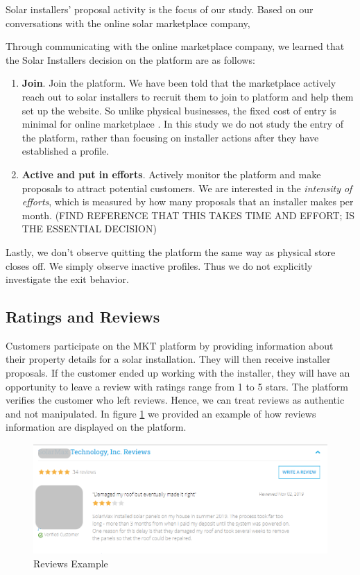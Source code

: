 \documentclass[msom,blindrev]{informs3}
\begin{document}
Solar installers' proposal activity is the focus of our study. Based on our conversations with the online solar marketplace company,  

Through communicating with the online marketplace company, we learned that the Solar Installers decision on the platform are as follows:

\begin{enumerate}
\item  \textbf{Join}. Join the platform. We have been told that the marketplace actively reach out to solar installers to recruit them to join to platform and help them set up the website. So unlike physical businesses, the fixed cost of entry is minimal for online marketplace \citep{haddad2015consumer}. In this study we do not study the entry of the platform, rather than focusing on installer actions after they have established a profile.  \\
\item  \textbf{Active and put in efforts}. Actively monitor the platform and make proposals to attract potential customers. We are interested in the\textit{ intensity of efforts}, which is measured by how many proposals that an installer makes per month. (FIND REFERENCE THAT THIS TAKES TIME AND EFFORT; IS THE ESSENTIAL DECISION)\\
\end{enumerate}

Lastly, we don't observe quitting the platform the same way as physical store closes off. We simply observe inactive profiles. Thus we do not explicitly investigate the exit behavior. 


\subsection{Ratings and Reviews}
Customers participate on the MKT platform by providing information about their property details for a solar installation. They will then receive installer proposals. If the customer ended up working with the installer, they will have an opportunity to leave a review with ratings range from 1 to 5 stars. The platform verifies the customer who left reviews. Hence, we can treat reviews as authentic and not manipulated. In figure \ref{reviews_example} we provided an example of how reviews information are displayed on the platform.
\begin{figure}
	\centering
	\includegraphics[width=0.81\linewidth]{reviews_example.png}
	\caption{Reviews Example}
	\label{reviews_example}
\end{figure}
\end{document}
